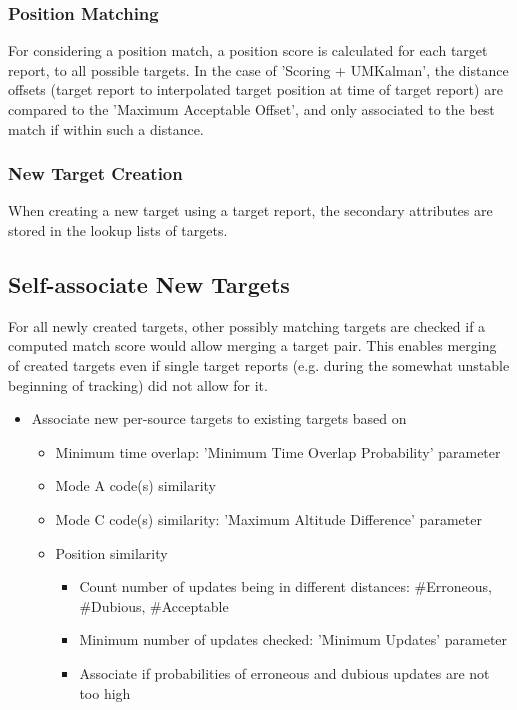 \begin{itemize}
\subsubsection{Position Matching}

For considering a position match, a position score is calculated for each target report, to all possible targets. In the case of 'Scoring + UMKalman', the distance offsets (target report to interpolated target position at time of target report) are compared to the 'Maximum Acceptable Offset', and only associated to the best match if within such a distance.

\subsubsection{New Target Creation}

When creating a new target using a target report, the secondary attributes are stored in the lookup lists of targets.

\subsection{Self-associate New Targets}

For all newly created targets, other possibly matching targets are checked if a computed match score would allow merging a target pair. 
This enables merging of created targets even if single target reports (e.g. during the somewhat unstable beginning of tracking) did not allow for it.

\begin{itemize}
\item Associate new per-source targets to existing targets based on
\begin{itemize}
\item Minimum time overlap: 'Minimum Time Overlap Probability' parameter
\item Mode A code(s) similarity
\item Mode C code(s) similarity: 'Maximum Altitude Difference' parameter
\item Position similarity
\begin{itemize}
\item Count number of updates being in different distances: \#Erroneous, \#Dubious, \#Acceptable
\item Minimum number of updates checked: 'Minimum Updates' parameter
\item Associate if probabilities of erroneous and dubious updates are not too high
\end{itemize}
\end{itemize}
\end{itemize}
\ \\


\end{itemize}
